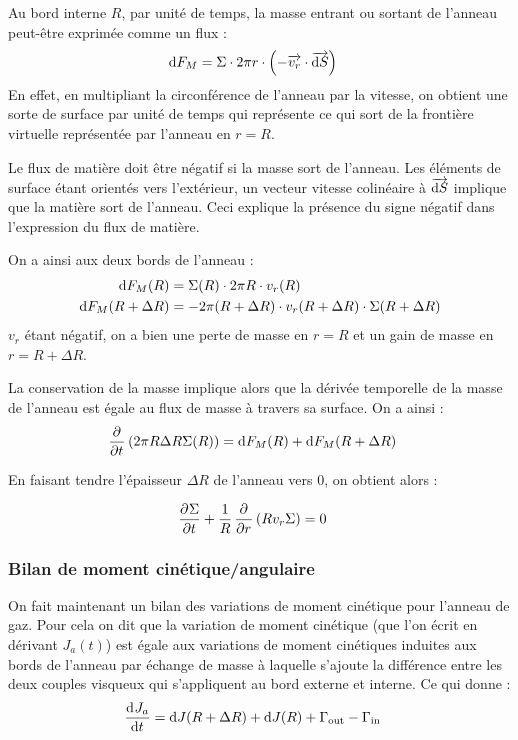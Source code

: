 Au bord interne $R$, par unité de temps, la masse entrant ou sortant de l'anneau peut-être exprimée comme un flux :
\begin{align}
\operatorname{d \!} F_M &= \Sigma \cdot 2\pi r \cdot \left( -{\overrightarrow{v_r}} \cdot {\overrightarrow{\operatorname{d \!}S}} \right)
\end{align}
En effet, en multipliant la circonférence de l'anneau par la vitesse, on obtient une sorte de surface par unité de temps qui représente ce qui sort de la frontière virtuelle représentée par l'anneau en $r=R$. 

Le flux de matière doit être négatif si la masse sort de l'anneau. Les éléments de surface étant orientés vers l'extérieur, un vecteur vitesse colinéaire à ${\overrightarrow{\operatorname{d \!} S}}$ implique que la matière sort de l'anneau. Ceci explique la présence du signe négatif dans l'expression du flux de matière.

On a ainsi aux deux bords de l'anneau :
\begin{subequations}
\begin{align}
\operatorname{d \!} F_M(R) &= \Sigma(R) \cdot 2\pi R \cdot v_r(R)\\
\operatorname{d \!} F_M(R+\Delta R) &= - 2\pi (R+\Delta R) \cdot v_r(R+\Delta R) \cdot \Sigma(R+\Delta R)
\end{align}\label{eq:dif_F_M}
\end{subequations}
$v_r$ étant négatif, on a bien une perte de masse en $r=R$ et un gain de masse en $r=R+\Delta R$.

La conservation de la masse implique alors que la dérivée temporelle de la masse de l'anneau est égale au flux de masse à travers sa surface. On a ainsi : 
\begin{align*}
\mathinner{ \dfrac{\partial{^{}}}{\partial{{t}^{}}} }\left(2\pi R \Delta R \Sigma(R)\right) &= \operatorname{d \!} F_M(R) + \operatorname{d \!} F_M(R+\Delta R)
\end{align*}

En faisant tendre l'épaisseur $\Delta R$ de l'anneau vers 0, on obtient alors :
\begin{important}
\begin{align}
\mathinner{ \dfrac{\partial{^{}}\Sigma}{\partial{{t}^{}}} } + \frac{1}{R}\mathinner{ \dfrac{\partial{^{}}}{\partial{{r}^{}}} }\left(R v_r \Sigma\right)&=0\label{eq:conservation_masse}
\end{align}
\end{important}

\subsubsection{Bilan de moment cinétique/angulaire}
On fait maintenant un bilan des variations de moment cinétique pour l'anneau de gaz. Pour cela on dit que la variation de moment cinétique (que l'on écrit en dérivant $J_a(t)$) est égale aux variations de moment cinétiques induites aux bords de l'anneau par échange de masse à laquelle s'ajoute la différence entre les deux couples visqueux qui s'appliquent au bord externe et interne. Ce qui donne : 
\begin{align}
\mathinner{ \dfrac{\operatorname{d \!}{^{}}J_a}{\operatorname{d \!}{{t}^{}}} } &= \operatorname{d \!} J(R+\Delta R) + \operatorname{d \!} J(R) + \Gamma_\text{out} - \Gamma_\text{in}\label{eq:cons_J_a}
\end{align}

